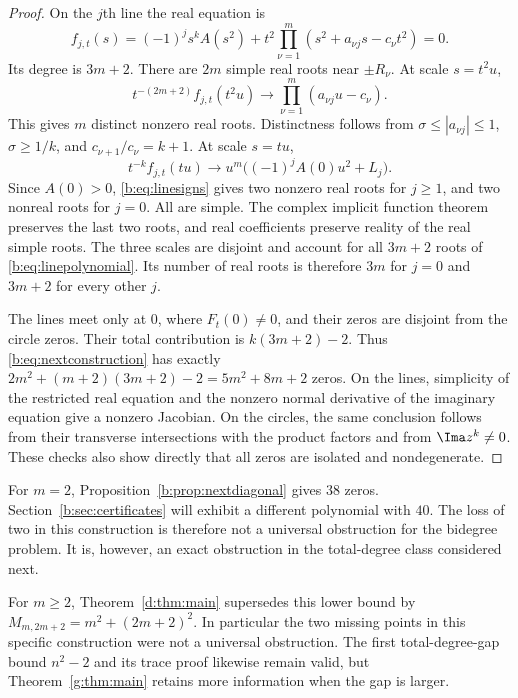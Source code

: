 \documentclass[UTF8,11pt]{ctexart}
\theoremstyle{definition}
\numberwithin{equation}{section}
\begin{document}
\begin{proof}
On the $j$th line the real equation is
\begin{equation}\label{b:eq:linepolynomial}
 f_{j,t}(s)=(-1)^j s^kA(s^2)+t^2
       \prod_{\nu=1}^m(s^2+a_{\nu j}s-c_\nu t^2)=0.
\end{equation}
Its degree is $3m+2$. There are $2m$ simple real roots near
$\pm R_\nu$. At scale $s=t^2u$,
\[
 t^{-(2m+2)}f_{j,t}(t^2u)\longrightarrow
                  \prod_{\nu=1}^m(a_{\nu j}u-c_\nu).
\]
This gives $m$ distinct nonzero real roots. Distinctness follows
from $\sigma\le|a_{\nu j}|\le1$, $\sigma\ge1/k$, and
$c_{\nu+1}/c_\nu=k+1$.
At scale $s=tu$,
\[
 t^{-k}f_{j,t}(tu)\longrightarrow
             u^m\bigl((-1)^jA(0)u^2+L_j\bigr).
\]
Since $A(0)>0$, \eqref{b:eq:linesigns} gives two nonzero real roots
for $j\ge1$, and two nonreal roots for $j=0$. All are simple.
The complex implicit function theorem preserves the last two roots,
and real coefficients preserve reality of the real simple roots.
The three scales are disjoint and account for all $3m+2$ roots of
\eqref{b:eq:linepolynomial}. Its number of real roots is therefore
$3m$ for $j=0$ and $3m+2$ for every other $j$.

The lines meet only at $0$, where $F_t(0)\ne0$, and their zeros
are disjoint from the circle zeros. Their total contribution is
$k(3m+2)-2$. Thus \eqref{b:eq:nextconstruction} has exactly
$2m^2+(m+2)(3m+2)-2=5m^2+8m+2$ zeros.
On the lines, simplicity of the restricted real equation and the
nonzero normal derivative of the imaginary equation give a nonzero
Jacobian. On the circles, the same conclusion follows from their
transverse intersections with the product factors and from
$\Ima z^k\ne0$. These checks also show directly that all zeros
are isolated and nondegenerate.
\end{proof}

For $m=2$, Proposition~\ref{b:prop:nextdiagonal} gives $38$ zeros.
Section~\ref{b:sec:certificates} will exhibit a different polynomial
with $40$. The loss of two in this construction is therefore not
a universal obstruction for the bidegree problem. It is, however,
an exact obstruction in the total-degree class considered next.


For $m\ge2$, Theorem~\ref{d:thm:main} supersedes this lower bound by
$M_{m,2m+2}=m^2+(2m+2)^2$. In particular the two missing points in this
specific construction were not a universal obstruction. The first
total-degree-gap bound $n^2-2$ and its trace proof likewise remain valid,
but Theorem~\ref{g:thm:main} retains more information when the gap is larger.
\end{document}
